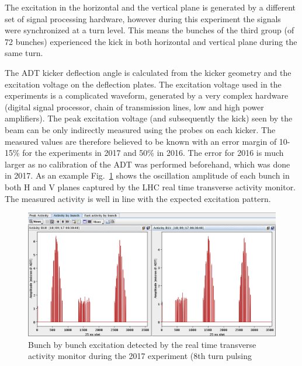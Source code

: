 \documentclass[%
 reprint,
 amsmath,amssymb,
 aps,
prstab,
]{revtex4-1}
\begin{document}
The excitation in the horizontal and the vertical plane is generated by a different set of signal processing hardware, however during this experiment the signals were synchronized at a turn level. This means the bunches of the third group (of 72 bunches) experienced the kick in both horizontal and vertical plane during the same turn.

The ADT kicker deflection angle is calculated from the kicker geometry and the excitation voltage on the deflection plates. The excitation voltage used in the experiments is a complicated waveform, generated by a very complex hardware (digital signal processor, chain of transmission lines, low and high power amplifiers). The peak excitation voltage (and subsequently the kick) seen by the beam can be only indirectly measured using the probes on each kicker. The measured values are therefore believed to be known with an error margin of 10-15\% for the experiments in 2017 and 50\% in 2016. The error for 2016 is much larger as no calibration of the ADT was performed beforehand, which was done in 2017. As an example Fig.~\ref{fig:fill_meas} shows the oscillation amplitude of each bunch in both H and V planes captured by the LHC real time transverse activity monitor. The measured activity is well in line with the expected excitation pattern.
\begin{figure}[h]
	\centering
	\includegraphics[width=1.0\linewidth]{bunchfilling_measured.png}	
	\caption{\label{fig:fill_meas} Bunch by bunch excitation detected by the real time transverse activity monitor during the 2017 experiment (8th turn pulsing}
\end{figure}
\end{document}
